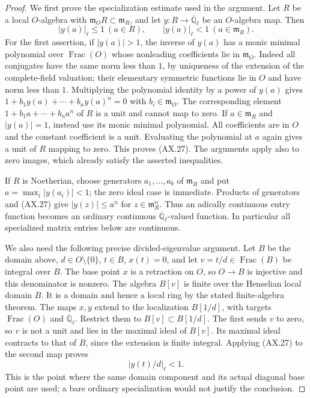 \begin{proof}
We first prove the specialization estimate used in the argument.
Let $R$ be a local $O$-algebra with $\mathfrak m_O R\subset
\mathfrak m_R$, and let $y:R\to\overline{\mathbb Q}_\ell$ be an
$O$-algebra map.  Then
\[
 |y(a)|_\ell\le1\ (a\in R),\qquad
 |y(a)|_\ell<1\ (a\in\mathfrak m_R).
 \tag{AX.27}
\]
For the first assertion, if $|y(a)|>1$, the inverse of $y(a)$
has a monic minimal polynomial over $\operatorname{Frac}(O)$
whose nonleading coefficients lie in $\mathfrak m_O$.
Indeed all conjugates have the same norm less than $1$, by
uniqueness of the extension of the complete-field valuation;
their elementary symmetric functions lie in $O$ and have norm
less than $1$.  Multiplying the polynomial identity by a power
of $y(a)$ gives $1+b_1y(a)+\cdots+b_ny(a)^n=0$ with
$b_i\in\mathfrak m_O$.  The corresponding element
$1+b_1a+\cdots+b_na^n$ of $R$ is a unit and cannot map to zero.
If $a\in\mathfrak m_R$ and $|y(a)|=1$, instead use its monic
minimal polynomial.  All coefficients are in $O$ and the constant
coefficient is a unit.  Evaluating the polynomial at $a$ again
gives a unit of $R$ mapping to zero.  This proves (AX.27).
The arguments apply also to zero images, which already satisfy
the asserted inequalities.

If $R$ is Noetherian, choose generators $a_1,\ldots,a_b$ of
$\mathfrak m_R$ and put $a=\max_i|y(a_i)|<1$; the zero ideal
case is immediate.  Products of generators and (AX.27) give
$|y(z)|\le a^n$ for $z\in\mathfrak m_R^n$.  Thus an adically
continuous entry function becomes an ordinary continuous
$\overline{\mathbb Q}_\ell$-valued function.  In particular all
specialized matrix entries below are continuous.

We also need the following precise divided-eigenvalue argument.
Let $B$ be the domain above, $d\in O\setminus\{0\}$,
$t\in B$, $x(t)=0$, and let $v=t/d\in\operatorname{Frac}(B)$
be integral over $B$.  The base point $x$ is a retraction on
$O$, so $O\to B$ is injective and this denominator is nonzero.
The algebra $B[v]$ is finite over the
Henselian local domain $B$.  It is a domain and hence a local
ring by the stated finite-algebra theorem.  The maps $x,y$
extend to the localization $B[1/d]$, with targets
$\operatorname{Frac}(O)$ and $\overline{\mathbb Q}_\ell$.
Restrict them to $B[v]\subset B[1/d]$.  The first sends $v$ to
zero, so $v$ is not a unit and lies in the maximal ideal of
$B[v]$.  Its maximal ideal contracts to that of $B$, since the
extension is finite integral.  Applying (AX.27) to the second
map proves
\[
                      |y(t)/d|_\ell<1.
 \tag{AX.28}
\]
This is the point where the same domain component and its actual
diagonal base point are used; a bare ordinary specialization
would not justify the conclusion.


\end{proof}
